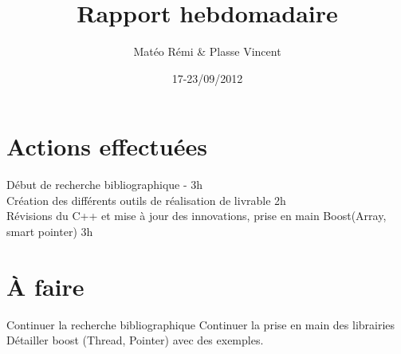 \documentclass{article}
\title{Rapport hebdomadaire}
\author{Matéo Rémi \& Plasse Vincent}
\date{17-23/09/2012}
\begin{document}
\maketitle

\section{Actions effectuées}
Début de recherche bibliographique - 3h \\
Création des différents outils de réalisation de livrable 2h \\
Révisions du C++ et mise à jour des innovations, prise en main Boost(Array, smart pointer) 3h \\

\section{À faire}

Continuer la recherche bibliographique
Continuer la prise en main des librairies
Détailler boost (Thread, Pointer) avec des exemples.
\end{document}
